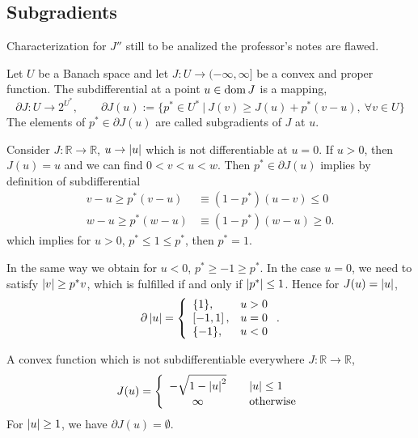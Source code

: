 \subsection{Subgradients}
Characterization for $J''$ still to be analized the professor's notes are flawed.
\begin{definition}
	Let $U$ be a Banach space and let $J:U\rightarrow (-\infty, \infty]$ be a convex and proper function.
	The subdifferential at a point $u \in \mathrm{dom\,} J$ is a mapping,
	\[
		\partial J : U \rightarrow 2^{U^*}, \qquad \partial J(u):=\lbrace p^* \in U^* \ | \ J(v)\geq J(u)+p^*(v-u),
		\ \forall v \in U\rbrace
	\]
	The elements of $p^* \in \partial J(u)$ are called subgradients of $J$ at $u$.
\end{definition}
\begin{example}
	Consider $J:\mathbb{R}\rightarrow \mathbb{R}$, $u\rightarrow \left|u\right|$ which is not differentiable at $u=0$. If $u>0$, then $J(u)=u$ and we can find $0<v<u<w$. Then $p^* \in \partial J(u)$ implies by definition of subdifferential
	\begin{align*}
		v-u \geq p^*(v-u) &\equiv (1-p^*)(u-v) \leq 0 \\
		w-u \geq p^*(w-u) &\equiv (1-p^*)(w-u) \geq 0.
	\end{align*}
	which implies for $u>0$, $p^* \leq 1 \leq p^*$, then $p^*=1$.
	
	In the same way we obtain for $u<0$, $p^*\geq -1 \geq p^*$. 
	In the case $u=0$, we need to satisfy $\left|v\right|\geq p^*v$, which is fulfilled if and only if $\left|p^*\right|\leq 1$. Hence for $J(u)=\left|u\right|$,
	\begin{equation*}
	\partial \left|u\right|=
	\left\lbrace
		\begin{array}{lr}
		\{1\}, & u>0 \\
		\left[-1,1\right], & u=0 \\
		\{-1\}, & u < 0
		\end{array}
	\right. .
	\end{equation*}
\end{example}

\begin{example}
	A convex function which is not subdifferentiable everywhere $J:\mathbb{R} \rightarrow \mathbb{R}$, 
	\begin{equation*}
		J(u)=\left\lbrace\begin{array}{cl}
		 -\sqrt{1-\left|u\right|^2} &\quad \left|u\right|\leq 1 \\
		 \infty &\quad \text{otherwise}
		\end{array}
	\right.
	\end{equation*}
	For $\left|u\right|\geq 1$, we have $\partial J(u) = \emptyset$.
\end{example}

